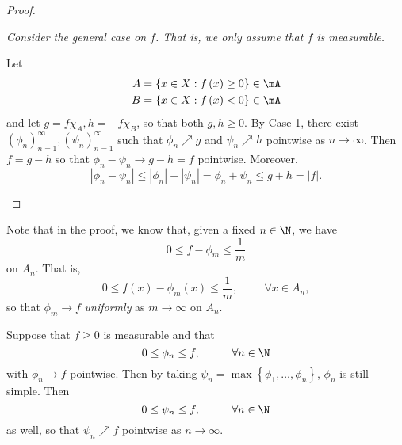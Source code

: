 \documentclass[pmath451]{subfiles}
\begin{document}
\begin{proof}
        \begin{case}
            \textit{Consider the general case on $f$. That is, we only assume that $f$ is measurable.}

            Let
            \begin{equation*}
                \begin{aligned}
                    A & = \left\lbrace x\in X: f\left( x \right)\geq 0 \right\rbrace\in\mA \\
                    B & = \left\lbrace x\in X: f\left( x \right)< 0 \right\rbrace\in\mA \\
                \end{aligned} 
            \end{equation*}
            and let $g=f\chi_A, h=-f\chi_B$, so that both $g,h\geq 0$. By Case 1, there exist $\left( \phi_{n} \right)^{\infty}_{n=1}, \left( \psi_{n} \right)^{\infty}_{n=1}$ such that $\phi_n\nearrow g$ and $\psi_n\nearrow h$ pointwise as $n\to\infty$. Then $f=g-h$ so that $\phi_n-\psi_n\to g-h = f$ pointwise. Moreover,
            \begin{equation*}
                \left| \phi_n-\psi_n \right| \leq \left| \phi_n \right| + \left| \psi_n \right| = \phi_n+\psi_n \leq g+h = \left| f \right|.
            \end{equation*}
        \end{case}
    \end{proof}
    
    \np Note that in the proof, we know that, given a fixed $n\in\N$, we have
    \begin{equation*}
        0\leq f-\phi_m \leq \frac{1}{m}
    \end{equation*}
    on $A_n$. That is,
    \begin{equation*}
        0\leq f\left( x \right)-\phi_m\left( x \right) \leq \frac{1}{m},\hspace{1cm}\forall x\in A_n,
    \end{equation*}
    so that $\phi_m\to f$ \textit{uniformly} as $m\to\infty$ on $A_n$.

    \np Suppose that $f\geq 0$ is measurable and that
    \begin{equation*}
        0\leq \phi_n \leq f,\hspace{1cm}\forall n\in\N
    \end{equation*}
    with $\phi_n\to f$ pointwise. Then by taking $\psi_n = \max\left\lbrace \phi_1,\ldots,\phi_n \right\rbrace$, $\phi_n$ is still simple. Then
    \begin{equation*}
        0\leq\psi_n\leq f,\hspace{1cm}\forall n\in\N
    \end{equation*}
    as well, so that $\psi_n\nearrow f$ pointwise as $n\to\infty$.
    
\end{document}
